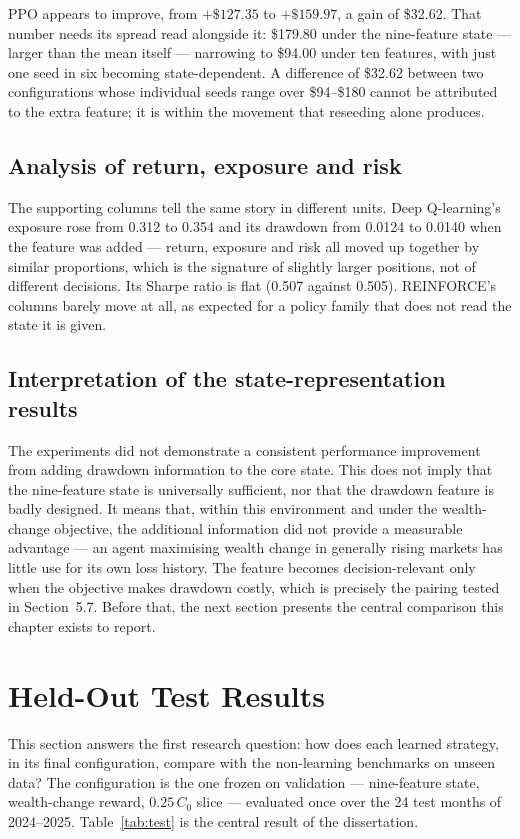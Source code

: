 PPO appears to improve, from $+\$127.35$ to $+\$159.97$, a gain of
\$32.62. That number needs its spread read alongside it: \$179.80 under the
nine-feature state --- larger than the mean itself --- narrowing to \$94.00
under ten features, with just one seed in six becoming state-dependent. A
difference of \$32.62 between two configurations whose individual seeds
range over \$94--\$180 cannot be attributed to the extra feature; it is
within the movement that reseeding alone produces.

\subsection{Analysis of return, exposure and risk}

The supporting columns tell the same story in different units. Deep
Q-learning's exposure rose from 0.312 to 0.354 and its drawdown from 0.0124
to 0.0140 when the feature was added --- return, exposure and risk all
moved up together by similar proportions, which is the signature of
slightly larger positions, not of different decisions. Its Sharpe ratio is
flat (0.507 against 0.505). REINFORCE's columns barely move at all, as
expected for a policy family that does not read the state it is given.

\subsection{Interpretation of the state-representation results}

The experiments did not demonstrate a consistent performance improvement
from adding drawdown information to the core state. This does not imply
that the nine-feature state is universally sufficient, nor that the
drawdown feature is badly designed. It means that, within this environment
and under the wealth-change objective, the additional information did not
provide a measurable advantage --- an agent maximising wealth change in
generally rising markets has little use for its own loss history. The
feature becomes decision-relevant only when the objective makes drawdown
costly, which is precisely the pairing tested in Section~5.7. Before that,
the next section presents the central comparison this chapter exists to
report.

\section{Held-Out Test Results}

This section answers the first research question: how does each learned
strategy, in its final configuration, compare with the non-learning
benchmarks on unseen data? The configuration is the one frozen on
validation --- nine-feature state, wealth-change reward, $0.25\,C_0$ slice
--- evaluated once over the 24 test months of 2024--2025.
Table~\ref{tab:test} is the central result of the dissertation.

